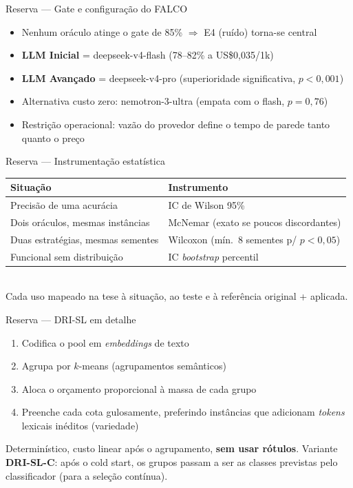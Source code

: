 \documentclass[aspectratio=169,11pt]{beamer}
\begin{document}
\begin{frame}{Reserva --- Gate e configuração do FALCO}
\footnotesize
\begin{itemize}
  \item Nenhum oráculo atinge o gate de 85\% $\Rightarrow$ E4 (ruído) torna-se central
  \item \textbf{LLM Inicial} = deepseek-v4-flash (78--82\% a US\$0,035/1k)
  \item \textbf{LLM Avançado} = deepseek-v4-pro (superioridade significativa, $p<0{,}001$)
  \item Alternativa custo zero: nemotron-3-ultra (empata com o flash, $p=0{,}76$)
  \item Restrição operacional: vazão do provedor define o tempo de parede tanto quanto o preço
\end{itemize}
\end{frame}


\begin{frame}{Reserva --- Instrumentação estatística}
\footnotesize
\begin{tabular}{ll}
\toprule
\textbf{Situação} & \textbf{Instrumento} \\
\midrule
Precisão de uma acurácia & IC de Wilson 95\% \\
Dois oráculos, mesmas instâncias & McNemar (exato se poucos discordantes) \\
Duas estratégias, mesmas sementes & Wilcoxon (mín.\ 8 sementes p/ $p<0{,}05$) \\
Funcional sem distribuição & IC \textit{bootstrap} percentil \\
\bottomrule
\end{tabular}
\vspace{0.6em}\\
Cada uso mapeado na tese à situação, ao teste e à referência original + aplicada.
\end{frame}


\begin{frame}{Reserva --- DRI-SL em detalhe}
\footnotesize
\begin{enumerate}
  \item Codifica o pool em \textit{embeddings} de texto
  \item Agrupa por $k$-means (agrupamentos semânticos)
  \item Aloca o orçamento proporcional à massa de cada grupo
  \item Preenche cada cota gulosamente, preferindo instâncias que
        adicionam \emph{tokens} lexicais inéditos (variedade)
\end{enumerate}
\vspace{0.4em}
Determinístico, custo linear após o agrupamento, \textbf{sem usar rótulos}.
Variante \textbf{DRI-SL-C}: após o cold start, os grupos passam a ser as
classes previstas pelo classificador (para a seleção contínua).
\end{frame}
\end{document}
